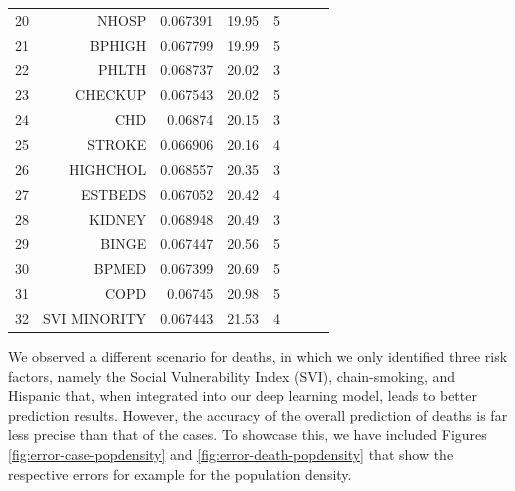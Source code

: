 \documentclass[a4paper, inpress]{jds} %
\renewcommand{\_}{%
    \textunderscore\hspace{0pt}%
}
\begin{document}
\begin{table}[!p]
\begin{tabular}{rrrrrlrl}
20	&	NHOSP	&	0.067391	&	19.95	&	5	 \\
21	&	BPHIGH	&	0.067799	&	19.99	&	5	 \\
22	&	PHLTH	&	0.068737	&	20.02	&	3	 \\
23	&	CHECKUP	&	0.067543	&	20.02	&	5	 \\
24	&	CHD	&	0.06874	&	20.15	&	3	 \\
25	&	STROKE	&	0.066906	&	20.16	&	4	 \\
26	&	HIGHCHOL	&	0.068557	&	20.35	&	3	 \\
27	&	ESTBEDS	&	0.067052	&	20.42	&	4	 \\
28	&	KIDNEY	&	0.068948	&	20.49	&	3	 \\
29	&	BINGE	&	0.067447	&	20.56	&	5	 \\
30	&	BPMED	&	0.067399	&	20.69	&	5	 \\
31	&	COPD	&	0.06745	&	20.98	&	5	 \\
32	&	SVI\_MINORITY	&	0.067443	&	21.53	&	4	 \\
\bottomrule
\end{tabular}
\end{table}

We observed a different scenario for deaths, in which we only
identified three risk factors, namely the Social Vulnerability Index
(SVI), chain-smoking, and Hispanic that, when integrated into our deep learning
model, leads to better prediction results. However, the accuracy of
the overall prediction of deaths is far less precise than that of the
cases. 
To showcase this, we have included Figures
\ref{fig:error-case-popdensity} and \ref{fig:error-death-popdensity}
that show the respective errors for example for the population density. 
\end{document}
